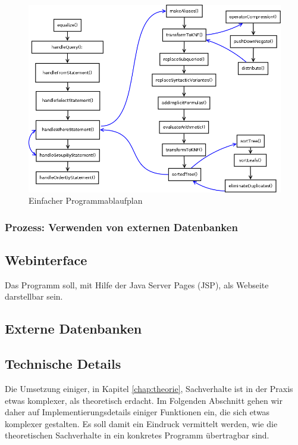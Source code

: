 \begin{figure}[h]
\includegraphics[scale=0.39]{Bilder/execPlan.png}
\caption{Einfacher Programmablaufplan}
\label{fig:execPlan}
\end{figure}

\subsubsection{Prozess: Verwenden von externen Datenbanken} 


\subsection{Webinterface}

Das Programm soll, mit Hilfe der Java Server Pages (JSP), als Webseite darstellbar sein. 

\subsection{Externe Datenbanken}


\subsection{Technische Details}

Die Umsetzung einiger, in Kapitel \ref{chap:theorie}, Sachverhalte ist in der Praxis etwas komplexer, als theoretisch erdacht. Im Folgenden Abschnitt gehen wir daher auf Implementierungsdetails einiger Funktionen ein, die sich etwas komplexer gestalten. Es soll damit ein Eindruck vermittelt werden, wie die theoretischen Sachverhalte in ein konkretes Programm übertragbar sind.


